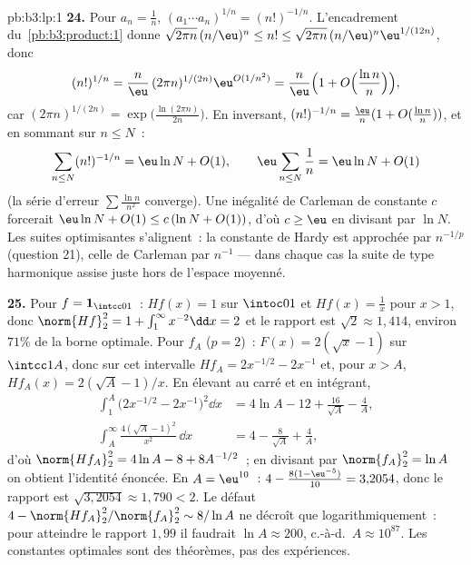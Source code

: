 \begin{solution}{pb:b3:lp:1}
\textbf{24.} Pour $a_n = \frac1n$, $(a_1\cdots a_n)^{1/n}
= (n!)^{-1/n}$. L'encadrement
du~\cref{pb:b3:product:1} donne $\sqrt{2\pi
n}\,(n/\eu)^n \leq n! \leq \sqrt{2\pi
n}\,(n/\eu)^n\eu^{1/(12n)}$, donc
\[
(n!)^{1/n} = \frac n\eu\,(2\pi n)^{1/(2n)}
\eu^{O(1/n^2)}
= \frac n\eu\Bigl(1 +
O\Bigl(\frac{\ln n}{n}\Bigr)\Bigr),
\]
car $(2\pi n)^{1/(2n)} = \exp\bigl(\frac{\ln(2\pi
n)}{2n}\bigr)$. En inversant, $(n!)^{-1/n} = \frac\eu n(1
+ O(\frac{\ln n}n))$, et en sommant sur $n \leq N$~:
\[
\sum_{n\leq N}(n!)^{-1/n}
= \eu\ln N + O(1),
\qquad
\eu\sum_{n\leq N}\frac1n = \eu\ln N + O(1)
\]
(la série d'erreur $\sum\frac{\ln n}{n^2}$ converge). Une
inégalité de Carleman de constante $c$ forcerait $\eu\ln N
+ O(1) \leq c\,(\ln N + O(1))$, d'où $c \geq \eu$ en
divisant par $\ln N$. Les suites optimisantes
s'alignent~: la constante de Hardy est approchée par
$n^{-1/p}$ (question 21), celle de Carleman par $n^{-1}$
--- dans chaque cas la suite de type harmonique assise
juste hors de l'espace moyenné.

\textbf{25.} Pour $f = \mathbf 1_{\intcc01}$~: $Hf(x) = 1$
sur $\intoc01$ et $Hf(x) = \frac1x$ pour $x > 1$, donc
$\norm{Hf}_2^2 = 1 + \int_1^\infty x^{-2}\dd x = 2$ et le
rapport est $\sqrt2 \approx 1{,}414$, environ $71\%$ de la
borne optimale. Pour $f_A$ ($p = 2$)~: $F(x) = 2(\sqrt x -
1)$ sur $\intcc1A$, donc sur cet intervalle $Hf_A =
2x^{-1/2} - 2x^{-1}$ et, pour $x > A$, $Hf_A(x) = 2(\sqrt
A - 1)/x$. En élevant au carré et en intégrant,
\begin{align*}
\int_1^A\bigl(2x^{-1/2} - 2x^{-1}\bigr)^2\dd x
&= 4\ln A - 12 + \frac{16}{\sqrt A} - \frac4A,\\
\int_A^{\infty}\frac{4(\sqrt A - 1)^2}{x^2}\,\dd x
&= 4 - \frac{8}{\sqrt A} + \frac4A,
\end{align*}
d'où $\norm{Hf_A}_2^2 = 4\ln A - 8 + 8A^{-1/2}$~; en
divisant par $\norm{f_A}_2^2 = \ln A$ on obtient l'identité
énoncée. En $A = \eu^{10}$~: $4 - \frac{8(1 -
\eu^{-5})}{10} = 3{,}2054$, donc le rapport est
$\sqrt{3{,}2054} \approx 1{,}790 < 2$. Le défaut $4 -
\norm{Hf_A}_2^2/\norm{f_A}_2^2 \sim 8/\ln A$ ne décroît
que logarithmiquement~: pour atteindre le rapport $1{,}99$
il faudrait $\ln A \approx 200$, c.-à-d.\ $A \approx
10^{87}$. Les constantes optimales sont des théorèmes, pas
des expériences.
\end{solution}
